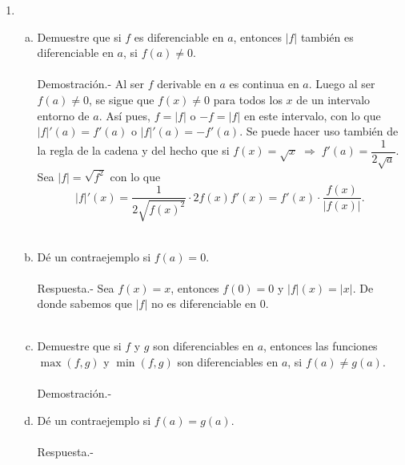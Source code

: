 \begin{enumerate}[\bfseries 1.]
     \item
	 \begin{enumerate}[(a)]

	     \item Demuestre que si $f$ es diferenciable en $a$, entonces $|f|$ también es diferenciable en $a$, si $f(a)\neq 0.$\\\\
		 Demostración.-\; Al ser $f$ derivable en $a$ es continua en $a$. Luego al ser $f(a)\neq 0$, se sigue que $f(x)\neq 0$ para todos los $x$ de un intervalo entorno de $a$. Así pues, $f=|f|$ o $-f=|f|$ en este intervalo, con lo que $|f|'(a)=f'(a)$ o $|f|'(a)=-f'(a)$. Se puede hacer uso también de la regla de la cadena y del hecho que si $f(x)=\sqrt{x}\; \Rightarrow \; f'(a)=\dfrac{1}{2\sqrt{a}}$. Sea $|f|=\sqrt{f^2}$ con lo que 
		 $$|f|'(x)=\dfrac{1}{2\sqrt{f(x)^2}} \cdot 2f(x)f'(x)=f'(x)\cdot \dfrac{f(x)}{|f(x)|}.$$\\

	     \item Dé un contraejemplo si $f(a)=0$.\\\\
		 Respuesta.-\; Sea $f(x)=x$, entonces $f(0)=0$ y $|f|(x)=|x|.$ De donde sabemos que $|f|$ no es diferenciable en $0$.\\\\ 

	     \item Demuestre que si $f$ y $g$ son diferenciables en $a$, entonces las funciones $\max(f,g)$ y $\min(f,g)$ son diferenciables en $a$, si $f(a)\neq g(a)$.\\\\
		 Demostración.-\;

	     \item Dé un contraejemplo si $f(a)=g(a)$.\\\\
		 Respuesta.-\;

	 \end{enumerate}


\end{enumerate}
